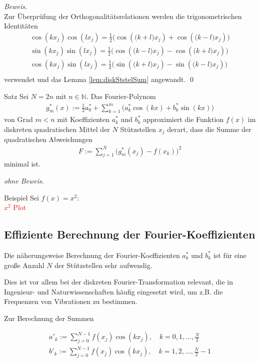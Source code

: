 \textit{Beweis.} \\
Zur Überprüfung der Orthogonalitätsrelationen werden die trigonometrischen Identitäten
\begin{align*}
  \cos(kx_j)\cos(lx_j) = \tfrac{1}{2}\Big(\cos(\big(k+l\big)x_j) + \cos(\big(k-l\big)x_j)\Big) \\
  \sin(kx_j)\sin(lx_j) = \tfrac{1}{2}\Big(\cos(\big(k-l\big)x_j) - \cos(\big(k+l\big)x_j)\Big) \\
  \cos(kx_j)\sin(lx_j) = \tfrac{1}{2}\Big(\sin(\big(k+l\big)x_j) - \sin(\big(k-l\big)x_j)\Big) \\
\end{align*}
verwendet und das Lemma \ref{lem:diskStstelSum} angewandt.
\qed 

\begin{colbox}{Satz}
  Sei $N=2n$ mit $n\in\mathbb{N}$. Das Fourier-Polynom
  \begin{align*}
  g_m^*(x) := \tfrac{1}{2}a^*_0 + \sum_{k=1}^{m}\Big(a^*_k\cos(kx)+b^*_k\sin(kx)\Big)
  \end{align*}
  von Grad $m<n$ mit Koeffizienten $a_k^*$ und $b^*_k$ approximiert die Funktion $f(x)$ im diskreten quadratischen 
  Mittel der $N$ Stützstellen $x_j$ derart, dass die Summe der quadratischen Abweichungen 
  \begin{align*}
    F:=\sum_{j=1}^{N}\Big(g^*_m(x_j)-f(x_k)\Big)^2
  \end{align*}
  minimal ist.
\end{colbox}
\textit{ohne Beweis.}


\begin{colbox}{Beispiel}
  Sei $f(x)=x^2$: \\
  \textcolor{red}{$x^2$ Plot} 
\end{colbox}

\subsection{Effiziente Berechnung der Fourier-Koeffizienten}
Die näherungsweise Berechnung der Fourier-Koeffizienten $a_k^*$ und $b_k^*$ ist für eine große Anzahl $N$ der 
Stützstellen sehr aufwendig. 

Dies ist vor allem bei der diskreten Fourier-Transformation relevant, die in Ingenieur- und Naturwissenschaften 
häufig eingesetzt wird, um z.B. die Frequenzen von Vibrationen zu bestimmen. 

Zur Berechnung der Summen 

%
\begin{align*}
  a'_k := \sum_{j=0}^{N-1} f(x_j)\cos(kx_j), \quad k=0,1,\dots,\tfrac{N}{2} \\
  b'_k := \sum_{j=0}^{N-1} f(x_j)\cos(kx_j), \quad k=1,2,\dots,\tfrac{N}{2}-1 
  \tag{1}\label{eq:fftEQ1}
\end{align*}
%

